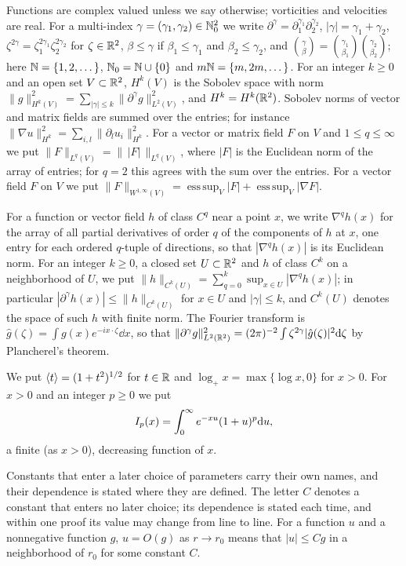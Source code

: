 Functions are complex valued unless we say otherwise; vorticities and
velocities are real. For a multi-index $\gamma=(\gamma_1,\gamma_2)\in\mathbb{N}_0^2$ we
write $\partial^\gamma=\partial_1^{\gamma_1}\partial_2^{\gamma_2}$,
$|\gamma|=\gamma_1+\gamma_2$, $\zeta^{2\gamma}=\zeta_1^{2\gamma_1}\zeta_2^{2\gamma_2}$
for $\zeta\in\mathbb{R}^2$,
$\beta\le\gamma$ if $\beta_1\le\gamma_1$ and $\beta_2\le\gamma_2$, and
$\binom\gamma\beta=\binom{\gamma_1}{\beta_1}\binom{\gamma_2}{\beta_2}$; here
$\mathbb{N}=\{1,2,\dots\}$, $\mathbb{N}_0=\mathbb{N}\cup\{0\}$ and $m\mathbb{N}=\{m,2m,\dots\}$. For an integer
$k\ge0$ and an open set $V\subset\mathbb{R}^2$, $H^k(V)$ is the Sobolev space with norm
$\|g\|_{H^k(V)}^2=\sum_{|\gamma|\le k}\|\partial^\gamma g\|_{L^2(V)}^2$, and
$H^k=H^k(\mathbb{R}^2)$. Sobolev norms of vector and matrix fields are summed over the
entries; for instance $\|\nabla u\|_{H^k}^2=\sum_{i,l}\|\partial_lu_i\|_{H^k}^2$.
For a vector or matrix field $F$ on $V$ and $1\le q\le\infty$ we put
$\|F\|_{L^q(V)}=\|\,|F|\,\|_{L^q(V)}$, where $|F|$ is the Euclidean norm of the
array of entries; for $q=2$ this agrees with the sum over the entries. For a
vector field $F$ on $V$ we put
$\|F\|_{W^{1,\infty}(V)}=\operatorname{ess\,sup}_V|F|+\operatorname{ess\,sup}_V|\nabla F|$.

For a function or vector field $h$ of class $C^q$ near a point $x$, we write
$\nabla^qh(x)$ for the array of all partial derivatives of order $q$ of the
components of $h$ at $x$, one entry for each ordered $q$-tuple of directions,
so that $|\nabla^qh(x)|$ is its Euclidean norm. For an integer $k\ge0$, a closed
set $U\subset\mathbb{R}^2$ and $h$ of class $C^k$ on a neighborhood of $U$, we put
$\|h\|_{C^k(U)}=\sum_{q=0}^k\sup_{x\in U}|\nabla^qh(x)|$;
in particular $|\partial^\gamma h(x)|\le\|h\|_{C^k(U)}$ for $x\in U$ and
$|\gamma|\le k$, and $C^k(U)$ denotes the space of such $h$ with finite norm.
The Fourier transform is $\hat g(\zeta)=\int g(x)e^{-ix\cdot\zeta}\dd x$, so that
$\|\partial^\gamma g\|_{L^2(\mathbb{R}^2)}^2=(2\pi)^{-2}\int\zeta^{2\gamma}|\hat g(\zeta)|^2\dd\zeta$
by Plancherel's theorem.

We put $\langle t\rangle=(1+t^2)^{1/2}$ for $t\in\mathbb{R}$ and $\log_+x=\max\{\log x,0\}$ for
$x>0$. For $x>0$ and an integer $p\ge0$ we put
\begin{equation}
\label{eq:Ip}
I_{p}(x)=\int_0^\infty e^{-xu}(1+u)^p\dd u,
\end{equation}
a finite (as $x>0$), decreasing function of $x$.

Constants that enter a later choice of parameters carry their own names, and
their dependence is stated where they are defined. The letter $C$ denotes a
constant that enters no later choice; its dependence is stated each time, and
within one proof its value may change from line to line. For a function $u$
and a nonnegative function $g$, $u=O(g)$ as $r\to r_0$ means that $|u|\le Cg$ in
a neighborhood of $r_0$ for some constant $C$.

